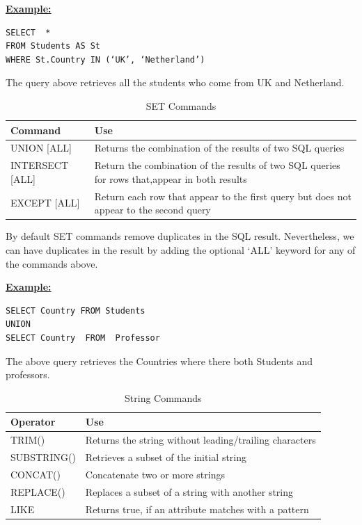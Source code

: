 \hfill\newpage
\noindent\textbf{\underline{Example:}}
\begin{mdframed}[backgroundcolor=lightgray!20] 
\begin{lstlisting}[style=SQL]
SELECT  *
FROM Students AS St 
WHERE St.Country IN (‘UK’, ‘Netherland’)
\end{lstlisting}
\end{mdframed}
The query above  retrieves all the students who come from UK and Netherland.

\begin{table}[h]
\centering
\caption{SET Commands }
\label{my-label}
\begin{tabular}{|p{3cm}|p{11.5cm}| }
\hline
\textbf{Command}     & \textbf{Use}                                                                                           \\ \hline
UNION {[}ALL{]}     & Returns the combination of the results of two SQL queries                                     \\ \hline
INTERSECT {[}ALL{]} & Return the combination of the results of two SQL queries for rows that,appear in both results \\ \hline
EXCEPT {[}ALL{]}    & Return each row that appear to the first query but does not appear to the second query        \\ \hline
\end{tabular}
\end{table}

By default SET commands remove duplicates in the SQL result. Nevertheless, we can have duplicates in the result by adding the optional ‘ALL’ keyword for any of the commands above.  

\noindent\textbf{\underline{Example:}}
\begin{mdframed}[backgroundcolor=lightgray!20] 
\begin{lstlisting}[style=SQL]
SELECT Country FROM Students 
UNION
SELECT Country  FROM  Professor
\end{lstlisting}
\end{mdframed}
The above query retrieves the Countries where there both Students and professors. 

\begin{table}[h]
\centering
\caption{String Commands}
\label{my-label}
\begin{tabular}{|p{3cm}|p{11.5cm}| }
\hline
\textbf{Operator} & \textbf{Use}                                         \\ \hline
TRIM()            & Returns the string without leading/trailing characters \\ \hline
SUBSTRING()       & Retrieves a subset of the initial string               \\ \hline
CONCAT()          & Concatenate two or more strings                        \\ \hline
REPLACE()         & Replaces a subset of a string with another string      \\ \hline
LIKE              & Returns true, if an attribute matches with a pattern   \\ \hline
\end{tabular}
\end{table}

